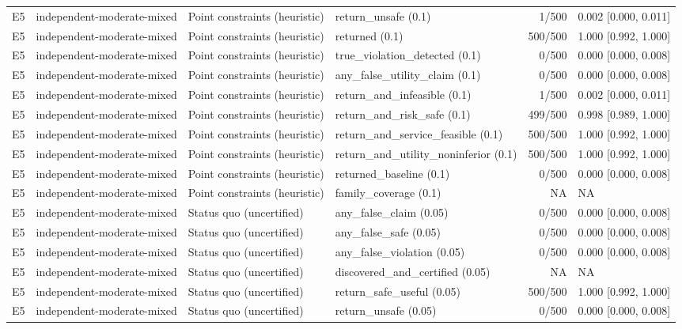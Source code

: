 \begin{longtable}{p{.04\linewidth}p{.18\linewidth}p{.19\linewidth}p{.16\linewidth}r p{.21\linewidth}}
E5 & independent-moderate-mixed & Point constraints (heuristic) & return\_unsafe (0.1) & 1/500 & 0.002 [0.000, 0.011]\\
E5 & independent-moderate-mixed & Point constraints (heuristic) & returned (0.1) & 500/500 & 1.000 [0.992, 1.000]\\
E5 & independent-moderate-mixed & Point constraints (heuristic) & true\_violation\_detected (0.1) & 0/500 & 0.000 [0.000, 0.008]\\
E5 & independent-moderate-mixed & Point constraints (heuristic) & any\_false\_utility\_claim (0.1) & 0/500 & 0.000 [0.000, 0.008]\\
E5 & independent-moderate-mixed & Point constraints (heuristic) & return\_and\_infeasible (0.1) & 1/500 & 0.002 [0.000, 0.011]\\
E5 & independent-moderate-mixed & Point constraints (heuristic) & return\_and\_risk\_safe (0.1) & 499/500 & 0.998 [0.989, 1.000]\\
E5 & independent-moderate-mixed & Point constraints (heuristic) & return\_and\_service\_feasible (0.1) & 500/500 & 1.000 [0.992, 1.000]\\
E5 & independent-moderate-mixed & Point constraints (heuristic) & return\_and\_utility\_noninferior (0.1) & 500/500 & 1.000 [0.992, 1.000]\\
E5 & independent-moderate-mixed & Point constraints (heuristic) & returned\_baseline (0.1) & 0/500 & 0.000 [0.000, 0.008]\\
E5 & independent-moderate-mixed & Point constraints (heuristic) & family\_coverage (0.1) & NA & NA\\
E5 & independent-moderate-mixed & Status quo (uncertified) & any\_false\_claim (0.05) & 0/500 & 0.000 [0.000, 0.008]\\
E5 & independent-moderate-mixed & Status quo (uncertified) & any\_false\_safe (0.05) & 0/500 & 0.000 [0.000, 0.008]\\
E5 & independent-moderate-mixed & Status quo (uncertified) & any\_false\_violation (0.05) & 0/500 & 0.000 [0.000, 0.008]\\
E5 & independent-moderate-mixed & Status quo (uncertified) & discovered\_and\_certified (0.05) & NA & NA\\
E5 & independent-moderate-mixed & Status quo (uncertified) & return\_safe\_useful (0.05) & 500/500 & 1.000 [0.992, 1.000]\\
E5 & independent-moderate-mixed & Status quo (uncertified) & return\_unsafe (0.05) & 0/500 & 0.000 [0.000, 0.008]\\

\end{longtable}

